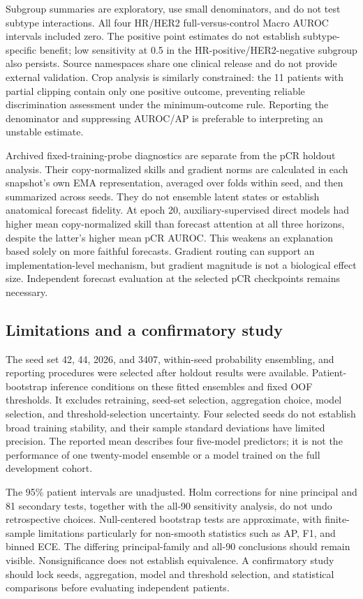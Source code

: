 Subgroup summaries are exploratory, use small denominators, and do not test subtype interactions. All four HR/HER2 full-versus-control Macro AUROC intervals included zero. The positive point estimates do not establish subtype-specific benefit; low sensitivity at 0.5 in the HR-positive/HER2-negative subgroup also persists. Source namespaces share one clinical release and do not provide external validation. Crop analysis is similarly constrained: the 11 patients with partial clipping contain only one positive outcome, preventing reliable discrimination assessment under the minimum-outcome rule. Reporting the denominator and suppressing AUROC/AP is preferable to interpreting an unstable estimate.

Archived fixed-training-probe diagnostics are separate from the pCR holdout analysis. Their copy-normalized skills and gradient norms are calculated in each snapshot's own EMA representation, averaged over folds within seed, and then summarized across seeds. They do not ensemble latent states or establish anatomical forecast fidelity. At epoch 20, auxiliary-supervised direct models had higher mean copy-normalized skill than forecast attention at all three horizons, despite the latter's higher mean pCR AUROC. This weakens an explanation based solely on more faithful forecasts. Gradient routing can support an implementation-level mechanism, but gradient magnitude is not a biological effect size. Independent forecast evaluation at the selected pCR checkpoints remains necessary.

\subsection{Limitations and a confirmatory study}
\label{sec:limitations}
The seed set 42, 44, 2026, and 3407, within-seed probability ensembling, and reporting procedures were selected after holdout results were available. Patient-bootstrap inference conditions on these fitted ensembles and fixed OOF thresholds. It excludes retraining, seed-set selection, aggregation choice, model selection, and threshold-selection uncertainty. Four selected seeds do not establish broad training stability, and their sample standard deviations have limited precision. The reported mean describes four five-model predictors; it is not the performance of one twenty-model ensemble or a model trained on the full development cohort.

The 95\% patient intervals are unadjusted. Holm corrections for nine principal and 81 secondary tests, together with the all-90 sensitivity analysis, do not undo retrospective choices. Null-centered bootstrap tests are approximate, with finite-sample limitations particularly for non-smooth statistics such as AP, F1, and binned ECE. The differing principal-family and all-90 conclusions should remain visible. Nonsignificance does not establish equivalence. A confirmatory study should lock seeds, aggregation, model and threshold selection, and statistical comparisons before evaluating independent patients.

